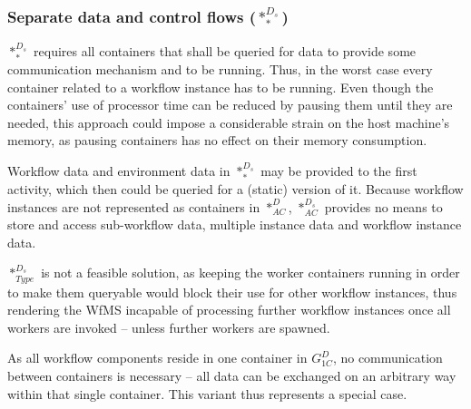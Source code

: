   \subsubsection{Separate data and control flows ($*_{*}^{D_s}$)} %
    $*_{*}^{D_s}$ requires all containers that shall be queried for data to provide some communication mechanism and to be running. Thus, in the worst case every container related to a workflow instance has to be running. Even though the containers' use of processor time can be reduced by pausing them until they are needed, this approach could impose a considerable strain on the host machine's memory, as pausing containers has no effect on their memory consumption.

    Workflow data and environment data in $*_{*}^{D_s}$ may be provided to the first activity, which then could be queried for a (static) version of it. Because workflow instances are not represented as containers in $*_{AC}^{D}$, $*_{AC}^{D_s}$ provides no means to store and access sub-workflow data, multiple instance data and workflow instance data.

    $*_{Type}^{D_s}$ is not a feasible solution, as keeping the worker containers running in order to make them queryable would block their use for other workflow instances, thus rendering the \ac{WfMS} incapable of processing further workflow instances once all workers are invoked -- unless further workers are spawned.

  As all workflow components reside in one container in $G_{1C}^{D}$, no communication between containers is necessary -- all data can be exchanged on an arbitrary way within that single container. This variant thus represents a special case.

